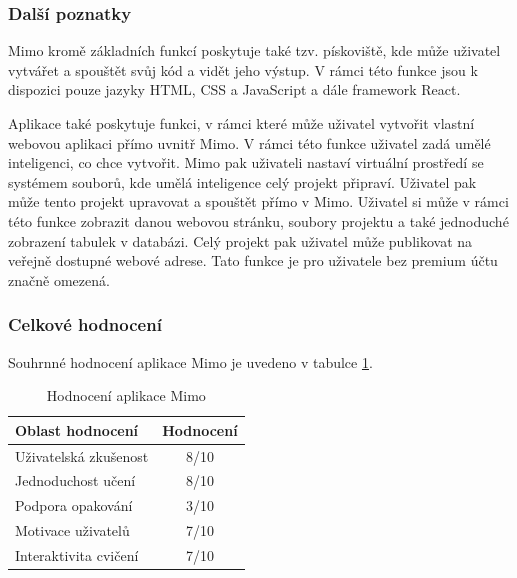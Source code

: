 \subsubsection{Další poznatky}

Mimo kromě základních funkcí poskytuje také tzv. pískoviště, kde může uživatel vytvářet a spouštět svůj kód a vidět jeho výstup. V rámci této funkce jsou k dispozici pouze jazyky HTML, CSS a JavaScript a dále framework React.

Aplikace také poskytuje funkci, v rámci které může uživatel vytvořit vlastní webovou aplikaci přímo uvnitř Mimo. V rámci této funkce uživatel zadá umělé inteligenci, co chce vytvořit. Mimo pak uživateli nastaví virtuální prostředí se systémem souborů, kde umělá inteligence celý projekt připraví. Uživatel pak může tento projekt upravovat a spouštět přímo v Mimo. Uživatel si může v rámci této funkce zobrazit danou webovou stránku, soubory projektu a také jednoduché zobrazení tabulek v databázi. Celý projekt pak uživatel může publikovat na veřejně dostupné webové adrese. Tato funkce je pro uživatele bez premium účtu značně omezená.


\subsubsection{Celkové hodnocení}

Souhrnné hodnocení aplikace Mimo je uvedeno v tabulce \ref{table:competitor-rating-mimo}.

\begin{table}[ht]
    \centering
    \begin{tabular}{@{} l c @{}}
        \toprule
        Oblast hodnocení & Hodnocení \\
        \midrule
        Uživatelská zkušenost & 8/10 \\
        Jednoduchost učení & 8/10 \\
        Podpora opakování & 3/10 \\
        Motivace uživatelů & 7/10 \\
        Interaktivita cvičení & 7/10 \\
        \bottomrule
    \end{tabular}
    \captionsetup{justification=centering}
    \caption{Hodnocení aplikace Mimo}
    \label{table:competitor-rating-mimo}
\end{table}
